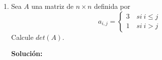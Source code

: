 \documentclass[12pt]{article}
\newenvironment{solucion}
{\begin{mdframed}[backgroundcolor=black!10]
		{\bf Solución:}\\
	}
	{
	\end{mdframed}
}
\newenvironment{preguntas}
{\begin{enumerate}\itemsep12pt
	}
	{
	\end{enumerate}
}
\newcommand{\ra}{\rightarrow}
\begin{document}
\begin{preguntas}
\begin{solucion}
$$\begin{bmatrix}
		1 & 1 & 0\\
		0 & 1 & -1
		\end{bmatrix}y = \begin{pmatrix}
		0 \\ 0 \\ 1
		\end{pmatrix} \ra y = \begin{pmatrix}
		0 \\ 0 \\ -1
		\end{pmatrix}$$
		Digamos ahora que
		$$Px = z \ra U^Ty = e_3 \ra \begin{bmatrix}
		1 & -1 & 0\\
		0 & 1 & 1\\
		0 & 0 & 1
		\end{bmatrix}z = \begin{pmatrix}
		0 \\ 0 \\ -1
		\end{pmatrix} \ra y = \begin{pmatrix}
		1 \\ 1 \\ -1
		\end{pmatrix}$$
		Por último
		$$Px = z \ra \begin{bmatrix}
		2 & 1 & 0\\
		0 & 1 & 1\\
		0 & 0 & -1
		\end{bmatrix}z = \begin{pmatrix}
		1 \\ 1 \\ -1
		\end{pmatrix} \ra y = \begin{pmatrix}
		-1 \\ 1 \\ 1
		\end{pmatrix}$$
		En conclusión, la tercera fila de $A^{-1}$ es $\begin{pmatrix}
		-1 \\ 1 \\ 1
		\end{pmatrix}$
\end{solucion}
\item Sea $A$ una matriz de $n \times n$ definida por
	$$a_{i,j} = 
	\begin{cases}
	3 \quad si\ i\leq j \\
	1 \quad si\ i > j
	\end{cases}$$
	Calcule $det(A)$.
\begin{solucion}

\end{solucion}
\end{preguntas}
\end{document}
